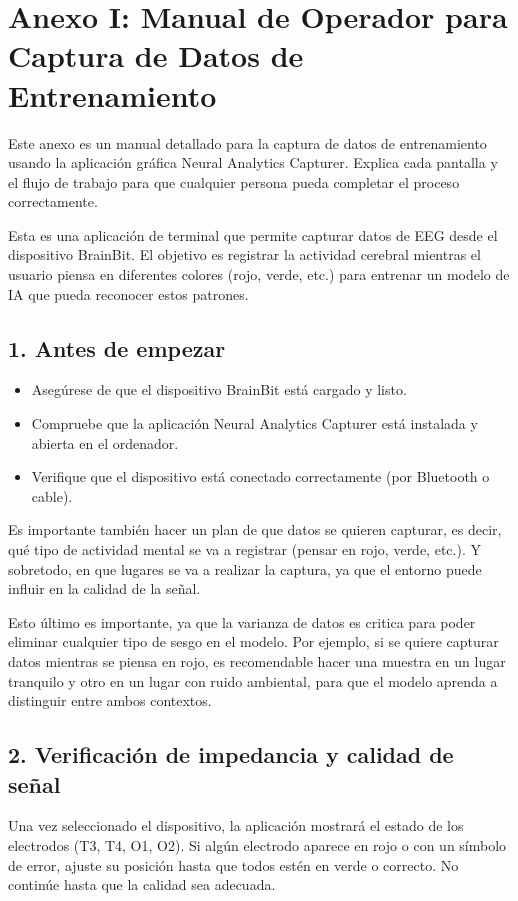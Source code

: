 \chapter*{Anexo I: Manual de Operador para Captura de Datos de Entrenamiento}

Este anexo es un manual detallado para la captura de datos de entrenamiento usando la aplicación gráfica Neural Analytics Capturer. Explica cada pantalla y el flujo de trabajo para que cualquier persona pueda completar el proceso correctamente.

Esta es una aplicación de terminal que permite capturar datos de EEG desde el dispositivo BrainBit. El objetivo es registrar la actividad cerebral mientras el usuario piensa en diferentes colores (rojo, verde, etc.) para entrenar un modelo de IA que pueda reconocer estos patrones.

\section*{1. Antes de empezar}
\begin{itemize}
    \item Asegúrese de que el dispositivo BrainBit está cargado y listo.
    \item Compruebe que la aplicación Neural Analytics Capturer está instalada y abierta en el ordenador.
    \item Verifique que el dispositivo está conectado correctamente (por Bluetooth o cable).
\end{itemize}

Es importante también hacer un plan de que datos se quieren capturar, es decir, qué tipo de actividad mental se va a registrar (pensar en rojo, verde, etc.). Y sobretodo, en que lugares se va a realizar la captura, ya que el entorno puede influir en la calidad de la señal.

Esto último es importante, ya que la varianza de datos es critica para poder eliminar cualquier tipo de sesgo en el modelo. Por ejemplo, si se quiere capturar datos mientras se piensa en rojo, es recomendable hacer una muestra en un lugar tranquilo y otro en un lugar con ruido ambiental, para que el modelo aprenda a distinguir entre ambos contextos.

\newpage
\section*{2. Verificación de impedancia y calidad de señal}
Una vez seleccionado el dispositivo, la aplicación mostrará el estado de los electrodos (T3, T4, O1, O2). Si algún electrodo aparece en rojo o con un símbolo de error, ajuste su posición hasta que todos estén en verde o correcto. No continúe hasta que la calidad sea adecuada.

